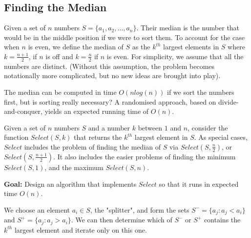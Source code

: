 \documentclass{proc}
\begin{document}
\subsection{Finding the Median}

Given a set of $n$ numbers $S = \{a_1, a_2, \ldots, a_n\}$. Their median is the number that would be in the middle position if we were to sort them. To account for the case when $n$ is even, we define the median of $S$ as the $k^{th}$ largest elements in $S$ where $k = \frac{n + 1}{2}$, if $n$ is off and $k = \frac{n}{2}$ if $n$ is even. For simplicity, we assume that all the numbers are distinct. (Without this assumption, the problem becomes notationally more complicated, but no new ideas are brought into play).

The median can be computed in time $O(n log(n))$ if we sort the numbers first, but is sorting really necessary? A randomised approach, based on divide-and-conquer, yields an expected running time of $O(n)$.

Given a set of $n$ numbers $S$ and a number $k$ between $1$ and $n$, consider the function $Select(S,k)$ that returns the $k^{th}$ largest element in $S$. As special cases, $Select$ includes the problem of finding the median of $S$ via $Select(S, \frac{n}{2})$, or $Select(S, \frac{n+1}{2})$. It also includes the easier problems of finding the minimum $Select(S, 1)$, and the maximum $Select(S, n)$.

\textbf{Goal:} Design an algorithm that implements $Select$ so that it runs in expected time $O(n)$.

We choose an element $a_i \in S$, the "splitter", and form the sets $S^- = \{a_j : a_j < a_i\}$ and $S^+ = \{a_j : a_j > a_i\}$. We can then determine which of $S^-$ or $S^+$ contains the $k^{th}$ largest element and iterate only on this one.
\end{document}
